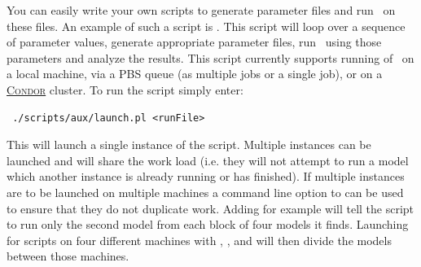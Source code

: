 You can easily write your own scripts to generate parameter files and run \glc\ on these files. An example of such a script is . This script will loop over a sequence of parameter values, generate appropriate parameter files, run \glc\ using those parameters and analyze the results. This script currently supports running of \glc\ on a local machine, via a PBS queue (as multiple jobs or a single job), or on a \href{https://research.cs.wisc.edu/htcondor/}{{\normalfont \scshape Condor}} cluster. To run the script simply enter:
\begin{verbatim}
 ./scripts/aux/launch.pl <runFile>
\end{verbatim}
This will launch a single instance of the script. Multiple instances can be launched and will share the work load (i.e. they will not attempt to run a model which another instance is already running or has finished). If multiple instances are to be launched on multiple machines a command line option to  can be used to ensure that they do not duplicate work. Adding  for example will tell the script to run only the second model from each block of four models it finds. Launching for  scripts on four different machines with , ,  and  will then divide the models between those machines.

